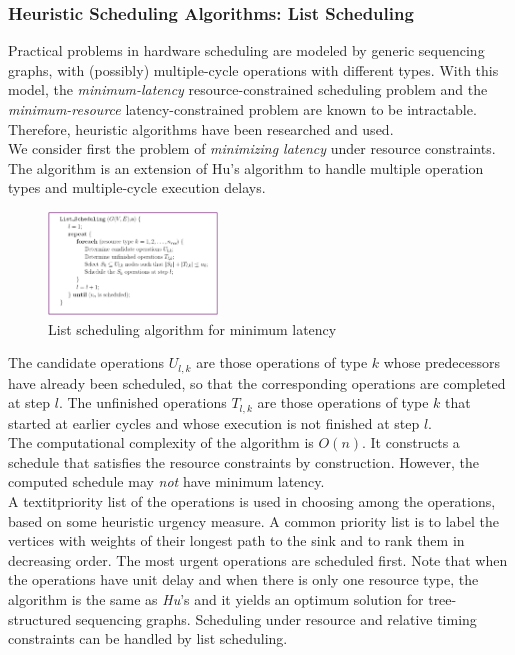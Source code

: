 \subsubsection{Heuristic Scheduling Algorithms: List Scheduling}	
Practical problems in hardware scheduling are modeled by generic sequencing graphs, with (possibly) multiple-cycle operations with different types. With this model, the \textit{minimum-latency}  resource-constrained scheduling problem and the  \textit{minimum-resource} latency-constrained problem are known to  be  intractable. Therefore, heuristic algorithms have been researched and used.\\
We consider first the problem of \textit{minimizing latency} under resource constraints. The algorithm is an extension of Hu's algorithm to handle multiple operation types and multiple-cycle execution delays.
\begin{figure}[H]
    \centering
    \includegraphics[width=0.4\textwidth]{./Cap4/Images/Image11.png}
    \caption{List scheduling algorithm for minimum latency}
    \label{fig:ListScheHUalg}
\end{figure}
The candidate operations  $ U_{l,k} $ are those operations of type $ k $ whose predecessors have already been scheduled, so that the corresponding operations are completed at step $ l $. The unfinished operations  $ T_{l,k} $ are those operations of type $ k $ that started at earlier cycles and whose execution is not
finished at step $ l $.\\
The computational complexity of the algorithm is  $ O(n) $.  It constructs a schedule that satisfies the resource constraints by construction. However, the computed schedule may \textit{not} have minimum latency.\\
A textit{priority  list } of the operations is used in choosing among the operations, based on some
heuristic urgency measure. A common priority list is to label the vertices with weights of their longest path to the sink and to rank them in decreasing order. The most urgent operations are scheduled first. Note that when the operations have unit delay and when there is only one resource type, the algorithm is the same as \textit{Hu}'s and it yields an optimum solution for tree-structured sequencing graphs. Scheduling under resource and relative timing constraints can be handled by list scheduling.


